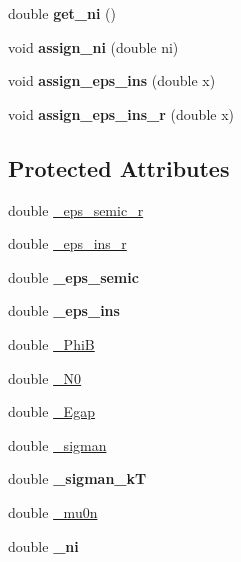 \begin{DoxyCompactItemize}
\item 
\hypertarget{classMaterial_a33ea40f0476383f1bf57238d24fa0bfb}{double {\bfseries get\-\_\-ni} ()}\label{classMaterial_a33ea40f0476383f1bf57238d24fa0bfb}

\item 
\hypertarget{classMaterial_adf65d32fbc7b571c6b47da4d3e57b6d7}{void {\bfseries assign\-\_\-ni} (double ni)}\label{classMaterial_adf65d32fbc7b571c6b47da4d3e57b6d7}

\item 
\hypertarget{classMaterial_ad0f66f8c50421e71d38db8856723ec99}{void {\bfseries assign\-\_\-eps\-\_\-ins} (double x)}\label{classMaterial_ad0f66f8c50421e71d38db8856723ec99}

\item 
\hypertarget{classMaterial_a255c5898496dea0405bbb506fe7192af}{void {\bfseries assign\-\_\-eps\-\_\-ins\-\_\-r} (double x)}\label{classMaterial_a255c5898496dea0405bbb506fe7192af}

\end{DoxyCompactItemize}
\subsection*{Protected Attributes}
\begin{DoxyCompactItemize}
\item 
double \hyperlink{classMaterial_a6a82dba4b8291e2bf1db15d72f45b0ab}{\-\_\-eps\-\_\-semic\-\_\-r}
\item 
double \hyperlink{classMaterial_aa6a5fb9dff802f6a5016ed65b20f3160}{\-\_\-eps\-\_\-ins\-\_\-r}
\item 
\hypertarget{classMaterial_a4578bd9cb0d0d90a29edb3e5b3b23f74}{double {\bfseries \-\_\-eps\-\_\-semic}}\label{classMaterial_a4578bd9cb0d0d90a29edb3e5b3b23f74}

\item 
\hypertarget{classMaterial_a3f67e1fd0244203052c454d5db524b8c}{double {\bfseries \-\_\-eps\-\_\-ins}}\label{classMaterial_a3f67e1fd0244203052c454d5db524b8c}

\item 
double \hyperlink{classMaterial_a8f0ce4108c5a396ab1db33789e24b61c}{\-\_\-\-Phi\-B}
\item 
double \hyperlink{classMaterial_a6451fdaa6afaa52aec832b79fe9adb79}{\-\_\-\-N0}
\item 
double \hyperlink{classMaterial_aef3731159d1893cbf5e95a7072ff914a}{\-\_\-\-Egap}
\item 
double \hyperlink{classMaterial_acdc3ca25ac421ca653ee4207491a8897}{\-\_\-sigman}
\item 
\hypertarget{classMaterial_a2eb1aefae05d36cea949b9710b344ce2}{double {\bfseries \-\_\-sigman\-\_\-k\-T}}\label{classMaterial_a2eb1aefae05d36cea949b9710b344ce2}

\item 
double \hyperlink{classMaterial_a6f71ecccbd8bdab525a92c3328bb079e}{\-\_\-mu0n}
\item 
\hypertarget{classMaterial_a4e55b24bb6b622508c22f244fe68c07b}{double {\bfseries \-\_\-ni}}\label{classMaterial_a4e55b24bb6b622508c22f244fe68c07b}

\end{DoxyCompactItemize}


